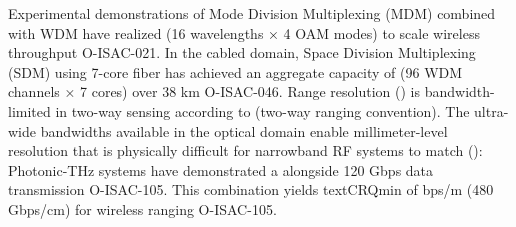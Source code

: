 {}\markdownRendererUlBeginTight
\markdownRendererUlItem {} Experimental demonstrations of Mode Division Multiplexing (MDM) combined with WDM have realized  (16 wavelengths × 4 OAM modes) to scale wireless throughput O-ISAC-021.\markdownRendererUlItemEnd 
\markdownRendererUlItem {} In the cabled domain, Space Division Multiplexing (SDM) using 7-core fiber has achieved an aggregate capacity of  (96 WDM channels × 7 cores) over 38 km O-ISAC-046.\markdownRendererSoftLineBreak
{}\markdownRendererUlItemEnd 
\markdownRendererUlEndTight \markdownRendererInterblockSeparator
{}
\markdownRendererSectionEnd \markdownRendererSectionBegin
{}\markdownRendererInterblockSeparator
{}Range resolution () is bandwidth-limited in two-way sensing according to  (two-way ranging convention). The ultra-wide bandwidths available in the optical domain enable millimeter-level resolution that is physically difficult for narrowband RF systems to match ():\markdownRendererInterblockSeparator
{}\markdownRendererUlBeginTight
\markdownRendererUlItem {} Photonic-THz systems have demonstrated a  alongside 120 Gbps data transmission O-ISAC-105.\markdownRendererUlItemEnd 
\markdownRendererUlItem {} This combination yields \markdownRendererDollarSign{}\markdownRendererBackslash{}text\markdownRendererLeftBrace{}CRQ\markdownRendererRightBrace{}\markdownRendererLeftBrace{}\markdownRendererBackslash{}min\markdownRendererRightBrace{}\markdownRendererDollarSign{} of  bps/m (480 Gbps/cm) for wireless ranging O-ISAC-105.\markdownRendererSoftLineBreak
{}\markdownRendererUlItemEnd 
